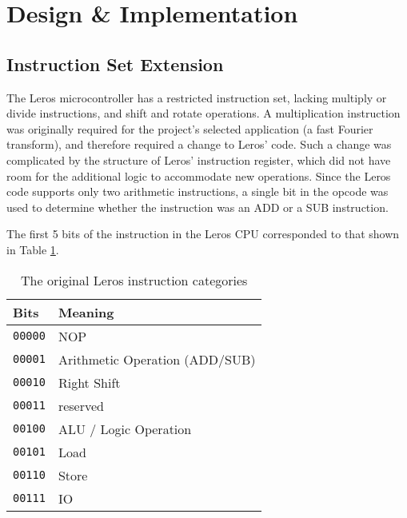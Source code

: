 \section{Design \& Implementation}
\subsection{Instruction Set Extension}

The Leros microcontroller has a restricted instruction set, lacking multiply or
divide instructions, and shift and rotate operations. A multiplication
instruction was originally required for the project's selected application (a
fast Fourier transform), and therefore required a change to Leros' code. Such a
change was complicated by the structure of Leros' instruction register, which
did not have room for the additional logic to accommodate new operations. Since
the Leros code supports only two arithmetic instructions, a single bit in the
opcode was used to determine whether the instruction was an ADD or a SUB
instruction.

The first 5 bits of the instruction in the Leros CPU corresponded to that shown
in Table \ref{tab:original-instruction}.

\begin{table}
\centering
\caption{The original Leros instruction categories}
\label{tab:original-instruction}
\begin{tabular}{|l|l|}
\hline
\textbf{Bits} & Meaning \\
\hline
\texttt{00000} & NOP \\
\texttt{00001} & Arithmetic Operation (ADD/SUB) \\
\texttt{00010} & Right Shift \\
\texttt{00011} & reserved \\
\texttt{00100} & ALU / Logic Operation \\
\texttt{00101} & Load \\
\texttt{00110} & Store \\
\texttt{00111} & IO \\
\hline
\end{tabular}
\end{table}

